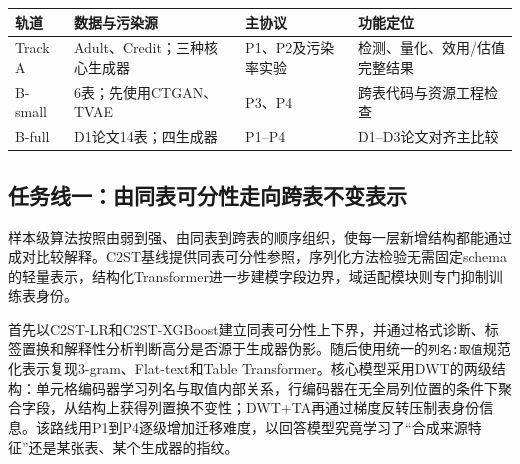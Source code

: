 \documentclass[
  chinese,
  12pt,
  a4paper,
  chinese,
  UTF8]{ctexart}
\begin{document}
\begin{longtable}[]{@{}
  >{\raggedright\arraybackslash}p{}
  >{\raggedright\arraybackslash}p{}
  >{\raggedright\arraybackslash}p{}
  >{\raggedright\arraybackslash}p{}@{}}
\toprule\noalign{}
\begin{minipage}[b]{\linewidth}\raggedright
轨道
\end{minipage} & \begin{minipage}[b]{\linewidth}\raggedright
数据与污染源
\end{minipage} & \begin{minipage}[b]{\linewidth}\raggedright
主协议
\end{minipage} & \begin{minipage}[b]{\linewidth}\raggedright
功能定位
\end{minipage} \\
\midrule\noalign{}
\endhead
\bottomrule\noalign{}
\endlastfoot
Track A & Adult、Credit；三种核心生成器 & P1、P2及污染率实验 &
检测、量化、效用/估值完整结果 \\
B-small & 6表；先使用CTGAN、TVAE & P3、P4 & 跨表代码与资源工程检查 \\
B-full & D1论文14表；四生成器 & P1--P4 & D1--D3论文对齐主比较 \\
\end{longtable}

\subsection{任务线一：由同表可分性走向跨表不变表示}\label{ux4efbux52a1ux7ebfux4e00ux7531ux540cux8868ux53efux5206ux6027ux8d70ux5411ux8de8ux8868ux4e0dux53d8ux8868ux793a}

样本级算法按照由弱到强、由同表到跨表的顺序组织，使每一层新增结构都能通过成对比较解释。C2ST基线提供同表可分性参照，序列化方法检验无需固定schema的轻量表示，结构化Transformer进一步建模字段边界，域适配模块则专门抑制训练表身份。

首先以C2ST-LR和C2ST-XGBoost建立同表可分性上下界，并通过格式诊断、标签置换和解释性分析判断高分是否源于生成器伪影。随后使用统一的\texttt{列名:取值}规范化表示复现3-gram、Flat-text和Table
Transformer。核心模型采用DWT的两级结构：单元格编码器学习列名与取值内部关系，行编码器在无全局列位置的条件下聚合字段，从结构上获得列置换不变性；DWT+TA再通过梯度反转压制表身份信息。该路线用P1到P4逐级增加迁移难度，以回答模型究竟学习了``合成来源特征''还是某张表、某个生成器的指纹。
\end{document}
